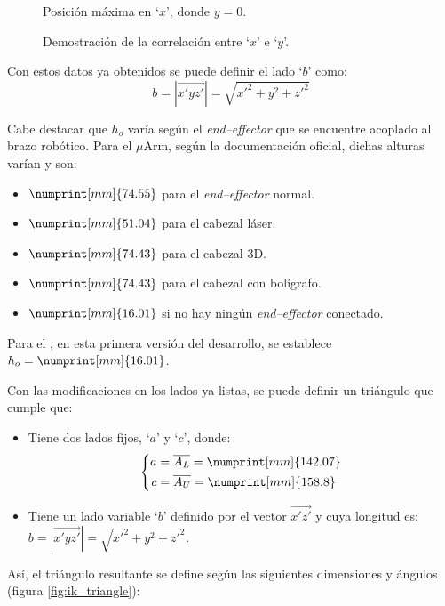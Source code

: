 \begin{figure}[H]
\begin{minipage}{.45\linewidth}
        \caption{Posición máxima en `$x$', donde $y = 0$.}
    \end{minipage}
    \caption{Demostración de la correlación entre `$x$' e `$y$'.}
    \label{fig:arm_limits}
\end{figure}

Con estos datos ya obtenidos se puede definir el lado `$b$' como:
\begin{equation*}
    b = \left|\overrightarrow{x'yz'}\right| = \sqrt{x'^2 + y^2 + z'^2}
\end{equation*}

Cabe destacar que $h_o$ varía según el \textit{end--effector} que se encuentre acoplado
al brazo robótico. Para el $\mu$Arm, según la documentación oficial, dichas alturas varían
y son\cite{UArmDeveloperSwiftProForArduino}:
\begin{itemize}
    \item $\numprint[mm]{74.55}$ para el \textit{end--effector} normal.
    \item $\numprint[mm]{51.04}$ para el cabezal láser.
    \item $\numprint[mm]{74.43}$ para el cabezal 3D.
    \item $\numprint[mm]{74.43}$ para el cabezal con bolígrafo.
    \item $\numprint[mm]{16.01}$ si no hay ningún \textit{end--effector} conectado.
\end{itemize}

Para el \pArm{}, en esta primera versión del desarrollo, se establece $h_o = \numprint[mm]{16.01}$.

Con las modificaciones en los lados ya listas, se puede definir un triángulo que cumple que:
\begin{itemize}
    \item Tiene dos lados fijos, `$a$' y `$c$', donde:
          \begin{equation*}
              \left\{\begin{aligned}
                  a & = \overline{A_L} = \numprint[mm]{142.07} \\
                  c & = \overline{A_U} = \numprint[mm]{158.8}
              \end{aligned}\right.
          \end{equation*}
    \item Tiene un lado variable `$b$' definido por el vector $\overrightarrow{x'z'}$
          y cuya longitud es: $b = \left|\overrightarrow{x'yz'}\right| = \sqrt{x'^2 + y^2 + z'^2}$.
\end{itemize}
Así, el triángulo resultante se define según las siguientes dimensiones y ángulos (figura
\ref{fig:ik_triangle}):

